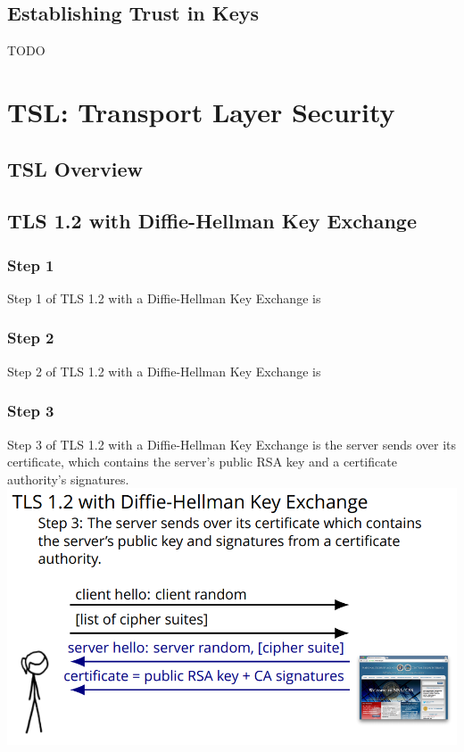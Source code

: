 \documentclass[11pt]{article} %
\begin{document}
\newpage
\subsection{Establishing Trust in Keys}
TODO

\newpage
\section{TSL: Transport Layer Security}

\subsection{TSL Overview}

\newpage
\subsection{TLS 1.2 with Diffie-Hellman Key Exchange}

\subsubsection{Step 1}
Step 1 of TLS 1.2 with a Diffie-Hellman Key Exchange is 

\newpage
\subsubsection{Step 2}
Step 2 of TLS 1.2 with a Diffie-Hellman Key Exchange is 

\newpage
\subsubsection{Step 3}
Step 3 of TLS 1.2 with a Diffie-Hellman Key Exchange is the server sends over 
its certificate, which contains the server’s public RSA key and a certificate 
authority's signatures.\\

\includegraphics[scale=.8]{./DiffieStep3.png}
\end{document}
